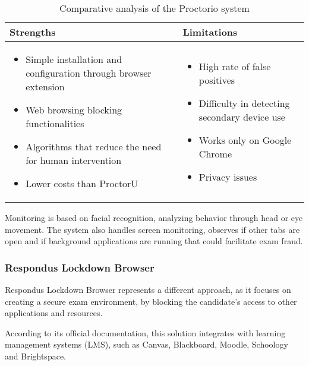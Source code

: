 \documentclass[12pt,a4paper]{article}
\begin{document}
\begin{table}[H]
\centering
\begin{tabular}{|p{7.5cm}|p{7.5cm}|}
\hline
\textbf{Strengths} & \textbf{Limitations} \\
\hline
\begin{itemize}
    \item Simple installation and configuration through browser extension
    \item Web browsing blocking functionalities
    \item Algorithms that reduce the need for human intervention
    \item Lower costs than ProctorU
\end{itemize} & 
\begin{itemize}
    \item High rate of false positives
    \item Difficulty in detecting secondary device use
    \item Works only on Google Chrome
    \item Privacy issues
\end{itemize} \\
\hline
\end{tabular}
\caption{Comparative analysis of the Proctorio system}
\end{table}

Monitoring is based on facial recognition, analyzing behavior through 
head or eye movement. The system also handles screen monitoring, observes if other tabs are open and if background applications are running that could facilitate exam fraud.

\subsubsection{Respondus Lockdown Browser}
Respondus Lockdown Browser represents a different approach, 
as it focuses on creating a secure exam environment,
by blocking the candidate's access to other applications and resources.

According to its official documentation\cite{respondus}, this solution
integrates with learning management systems (LMS), such as Canvas,
Blackboard, Moodle, Schoology and Brightspace.
\end{document}
